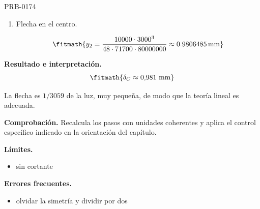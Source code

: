 \begin{studiumworked}{PRB-0174}
\begin{enumerate}
\item Flecha en el centro.

\[\fitmath{y_{2}=\frac{10000\cdot {3000}^{3}}{48\cdot 71700\cdot 80000000}\approx 0.9806485\,\mathrm{mm}}\]

\end{enumerate}

\textbf{Resultado e interpretación.}\[\fitmath{\delta_C \approx 0{,}981\ \mathrm{mm}}\]

La flecha es $1/3059$ de la luz, muy pequeña, de modo que la teoría lineal es adecuada.

\par\textbf{Comprobación.} Recalcula los pasos con unidades coherentes y aplica el control específico indicado en la orientación del capítulo.

\textbf{Límites.}\begin{itemize}\item sin cortante\end{itemize}

\textbf{Errores frecuentes.}\begin{itemize}\item olvidar la simetría y dividir por dos\end{itemize}

\end{studiumworked}

\Needspace{.3\textheight}

